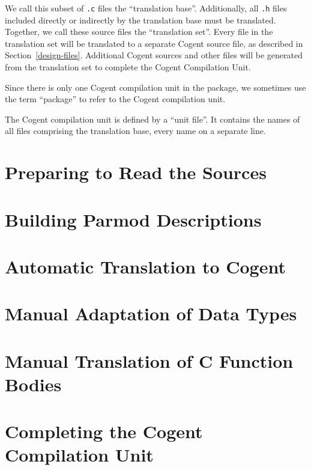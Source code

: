 \documentclass[a4paper]{report}
\newcommand{\code}[1]{\textnormal{\texttt{#1}}}
\begin{document}
We call this subset of \code{.c} files the ``translation base''. Additionally, all \code{.h} files
included directly or indirectly by the translation base must be translated. Together, we call these
source files the ``translation set''. Every file in the translation set will be translated to a 
separate Cogent source file, as described in Section~\ref{design-files}. Additional Cogent sources
and other files will be generated from the translation set to complete the Cogent Compilation Unit.

Since there is only one Cogent compilation unit in the package, we sometimes use the term ``package''
to refer to the Cogent compilation unit. 

The Cogent compilation unit is defined by a ``unit file''. It contains the names of all files
comprising the translation base, every name on a separate line. 

\section{Preparing to Read the Sources}
\label{app-prep}
%

\section{Building Parmod Descriptions}
\label{app-parmod}


\section{Automatic Translation to Cogent}
\label{app-transauto}


\section{Manual Adaptation of Data Types}
\label{app-transtype}


\section{Manual Translation of C Function Bodies}
\label{app-transfunction}


\section{Completing the Cogent Compilation Unit}
\label{app-unit}
%
\end{document}
